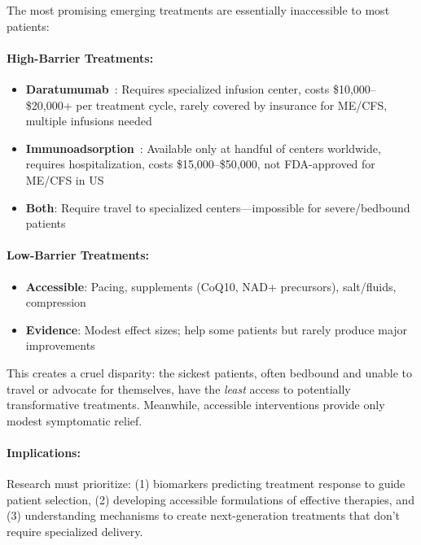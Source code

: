 \begin{warning}
\label{warn:accessibility-gap}
The most promising emerging treatments are essentially inaccessible to most patients:

\paragraph{High-Barrier Treatments:}
\begin{itemize}
    \item \textbf{Daratumumab}~\cite{Fluge2025daratumumab}: Requires specialized infusion center, costs \$10,000--\$20,000+ per treatment cycle, rarely covered by insurance for ME/CFS, multiple infusions needed
    \item \textbf{Immunoadsorption}~\cite{Stein2024immunoadsorption}: Available only at handful of centers worldwide, requires hospitalization, costs \$15,000--\$50,000, not FDA-approved for ME/CFS in US
    \item \textbf{Both}: Require travel to specialized centers---impossible for severe/bedbound patients
\end{itemize}

\paragraph{Low-Barrier Treatments:}
\begin{itemize}
    \item \textbf{Accessible}: Pacing, supplements (CoQ10, NAD+ precursors), salt/fluids, compression
    \item \textbf{Evidence}: Modest effect sizes; help some patients but rarely produce major improvements
\end{itemize}

This creates a cruel disparity: the sickest patients, often bedbound and unable to travel or advocate for themselves, have the \textit{least} access to potentially transformative treatments. Meanwhile, accessible interventions provide only modest symptomatic relief.

\paragraph{Implications:}
Research must prioritize: (1) biomarkers predicting treatment response to guide patient selection, (2) developing accessible formulations of effective therapies, and (3) understanding mechanisms to create next-generation treatments that don't require specialized delivery.
\end{warning}

